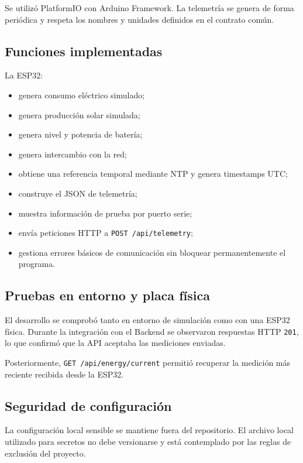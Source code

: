 \documentclass[11pt,a4paper,oneside]{report}
\begin{document}
Se utilizó PlatformIO con Arduino Framework. La telemetría se genera de forma periódica y respeta los nombres y unidades definidos en el contrato común.

\subsection{Funciones implementadas}

La ESP32:

\begin{itemize}
\item genera consumo eléctrico simulado;
\item genera producción solar simulada;
\item genera nivel y potencia de batería;
\item genera intercambio con la red;
\item obtiene una referencia temporal mediante NTP y genera timestamps UTC;
\item construye el JSON de telemetría;
\item muestra información de prueba por puerto serie;
\item envía peticiones HTTP a \texttt{POST /api/telemetry};
\item gestiona errores básicos de comunicación sin bloquear permanentemente el programa.
\end{itemize}

\subsection{Pruebas en entorno y placa física}

El desarrollo se comprobó tanto en entorno de simulación como con una ESP32 física. Durante la integración con el Backend se observaron respuestas HTTP \texttt{201}, lo que confirmó que la API aceptaba las mediciones enviadas.

Posteriormente, \texttt{GET /api/energy/current} permitió recuperar la medición más reciente recibida desde la ESP32.

\subsection{Seguridad de configuración}

La configuración local sensible se mantiene fuera del repositorio. El archivo local utilizado para secretos no debe versionarse y está contemplado por las reglas de exclusión del proyecto.
\end{document}
